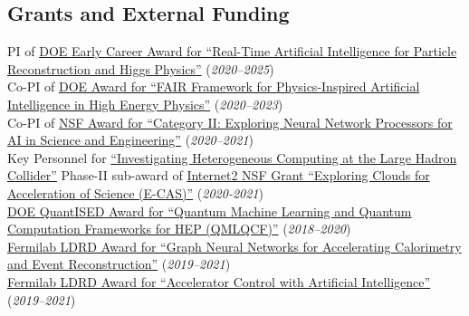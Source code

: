 \documentclass[11pt]{res}
\newcommand{\MarginText}[1]{\section{#1}\vspace{10pt}}
\begin{document}
\begin{resume}
\MarginText{Grants and External Funding}
PI of \href{https://science.osti.gov/-/media/early-career/pdf/FY20_DOE_SC_Early_Career_Research_Program_Abstracts.pdf}{DOE Early Career Award for ``Real-Time Artificial Intelligence for Particle Reconstruction and Higgs Physics''} (\textit{2020--2025})\\
Co-PI of \href{https://science.osti.gov/-/media/ascr/pdf/programdocuments/docs/2020/List_of_Awards_FAIR_Data.pdf}{DOE Award for ``FAIR Framework for Physics-Inspired Artificial Intelligence in
High Energy Physics''} (\textit{2020--2023})\\
Co-PI of \href{https://nsf.gov/awardsearch/showAward?AWD_ID=2005369}{NSF Award for ``Category II: Exploring Neural Network Processors for AI in Science and Engineering''} (\textit{2020--2021})\\
Key Personnel for \href{https://www.internet2.edu/news/detail/17957/}{``Investigating Heterogeneous Computing at the Large Hadron Collider''} Phase-II sub-award of \href{https://www.nsf.gov/awardsearch/showAward?AWD_ID=1904444}{Internet2 NSF Grant ``Exploring Clouds for Acceleration of Science (E-CAS)''} (\textit{2020-2021})\\
\href{https://pamspublic.science.energy.gov/WebPAMSExternal/Interface/Common/ViewPublicAbstract.aspx?rv=1f7d4729-6f93-40bd-a55f-c108545b1ea9&rtc=24&PRoleId=10}{DOE QuantISED Award for ``Quantum Machine Learning and Quantum Computation Frameworks for HEP (QMLQCF)''} (\textit{2018--2020})\\
\href{https://ldrd.fnal.gov/subdir/FNAL-LDRD-2019-017-D1.pdf}{Fermilab LDRD Award for ``Graph Neural Networks for Accelerating Calorimetry and Event Reconstruction''} (\textit{2019--2021})\\
\href{https://ldrd.fnal.gov/subdir/FNAL-LDRD-2019-027-D1.pdf}{Fermilab LDRD Award for ``Accelerator Control with Artificial Intelligence''} (\textit{2019--2021})\\



\end{resume}
\end{document}
